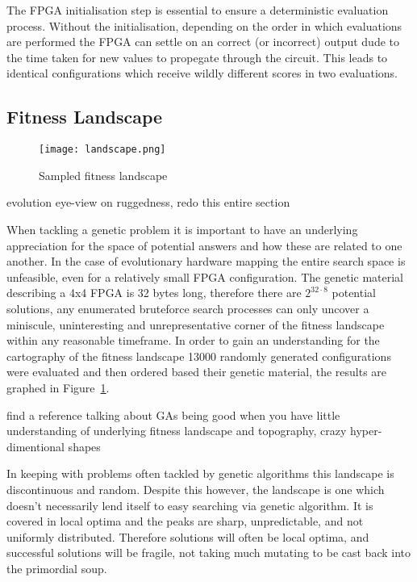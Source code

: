 The FPGA initialisation step is essential to ensure a deterministic evaluation
process. Without the initialisation, depending on the order in which evaluations
are performed the FPGA can settle on an correct (or incorrect) output dude to the
time taken for new values to propegate through the circuit. This leads to identical
configurations which receive wildly different scores in two evaluations.

\subsection{Fitness Landscape}

\begin{figure}
\centering
\texttt{[image: landscape.png]}
\caption{Sampled fitness landscape}
\label{fig:landscape}
\end{figure}

\todo evolution eye-view on ruggedness, redo this entire section

When tackling a genetic problem it is important to have an underlying appreciation
for the space of potential answers and how these are related to one another.
In the case of evolutionary hardware
mapping the entire search space is unfeasible, even for a relatively small
FPGA configuration.
The genetic material describing a 4x4 FPGA
is 32 bytes long, therefore there are $2^{32\cdot8}$ potential solutions, any
enumerated bruteforce search processes can only uncover a
miniscule, uninteresting and unrepresentative corner of the fitness landscape
within any reasonable timeframe.
In order to gain an understanding for the cartography of the fitness landscape
13000 randomly generated configurations were evaluated and then ordered based
their genetic material, the results are graphed in Figure~\ref{fig:landscape}.

\todo find a reference talking about GAs being good when you have little understanding
of underlying fitness landscape and topography, crazy hyper-dimentional shapes

In keeping with problems often tackled by genetic algorithms this landscape is discontinuous
and random. Despite this however,
the landscape is one which doesn't necessarily lend itself to easy searching via genetic algorithm.
It is covered in local optima and the peaks are sharp, unpredictable, and not uniformly
distributed. Therefore solutions will often be local optima, and successful solutions will
be fragile, not taking much mutating to be cast back into the primordial soup.

